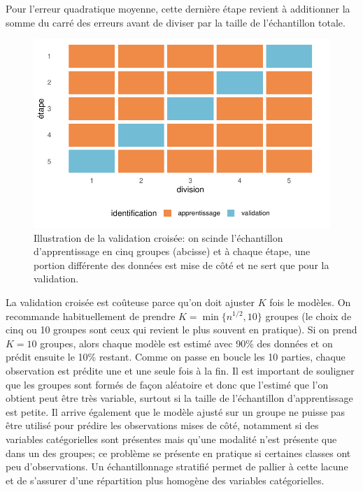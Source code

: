 \documentclass[
  11pt,
  letterpaper,
]{scrbook}
\theoremstyle{definition}
\theoremstyle{remark}
\begin{document}
Pour l'erreur quadratique moyenne, cette dernière étape revient à
additionner la somme du carré des erreurs avant de diviser par la taille
de l'échantillon totale.

\begin{figure}[ht!]

{\centering \includegraphics[width=1\textwidth,height=\textheight]{selectionmodeles_files/figure-pdf/fig-validationcroiseeillust-1.pdf}

}

\caption{\label{fig-validationcroiseeillust}Illustration de la
validation croisée: on scinde l'échantillon d'apprentissage en cinq
groupes (abcisse) et à chaque étape, une portion différente des données
est mise de côté et ne sert que pour la validation.}

\end{figure}

La validation croisée est coûteuse parce qu'on doit ajuster \(K\) fois
le modèles. On recommande habituellement de prendre
\(K=\min\{n^{1/2}, 10\}\) groupes (le choix de cinq ou 10 groupes sont
ceux qui revient le plus souvent en pratique). Si on prend \(K=10\)
groupes, alors chaque modèle est estimé avec 90\% des données et on
prédit ensuite le 10\% restant. Comme on passe en boucle les 10 parties,
chaque observation est prédite une et une seule fois à la fin. Il est
important de souligner que les groupes sont formés de façon aléatoire et
donc que l'estimé que l'on obtient peut être très variable, surtout si
la taille de l'échantillon d'apprentissage est petite. Il arrive
également que le modèle ajusté sur un groupe ne puisse pas être utilisé
pour prédire les observations mises de côté, notamment si des variables
catégorielles sont présentes mais qu'une modalité n'est présente que
dans un des groupes; ce problème se présente en pratique si certaines
classes ont peu d'observations. Un échantillonnage stratifié permet de
pallier à cette lacune et de s'assurer d'une répartition plus homogène
des variables catégorielles.
\end{document}
